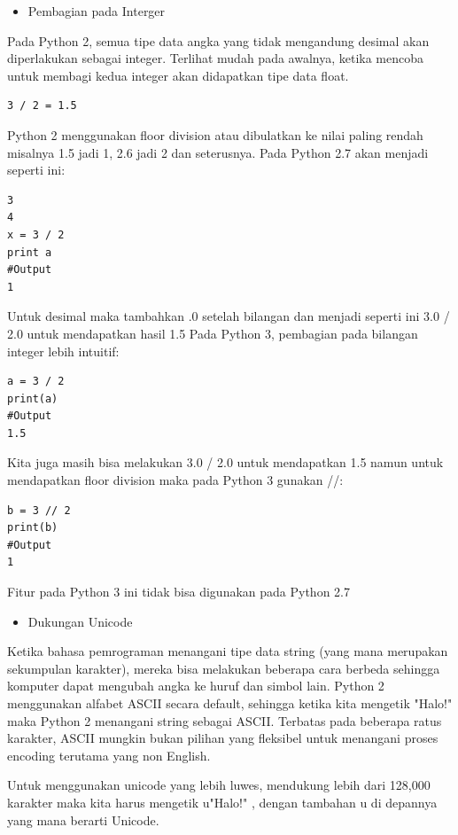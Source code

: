 \begin{itemize}
\item Pembagian pada Interger
\end{itemize}
Pada Python 2, semua tipe data angka yang tidak mengandung desimal akan diperlakukan sebagai integer. Terlihat mudah pada awalnya, ketika mencoba untuk membagi kedua integer akan didapatkan tipe data float.

\begin{lstlisting}
3 / 2 = 1.5
\end{lstlisting}

Python 2 menggunakan floor division atau dibulatkan ke nilai paling rendah misalnya 1.5 jadi 1, 2.6 jadi 2 dan seterusnya. Pada Python 2.7 akan menjadi seperti ini:

\begin{lstlisting}
3
4
x = 3 / 2
print a
#Output
1
\end{lstlisting}

Untuk desimal maka tambahkan .0 setelah bilangan dan menjadi seperti ini 3.0 / 2.0  untuk mendapatkan hasil 1.5
Pada Python 3, pembagian pada bilangan integer lebih intuitif:

\begin{lstlisting}
a = 3 / 2
print(a)
#Output
1.5
\end{lstlisting}

Kita juga masih bisa melakukan 3.0 / 2.0  untuk mendapatkan 1.5 namun untuk mendapatkan floor division maka pada Python 3 gunakan //:
\begin{lstlisting}
b = 3 // 2
print(b)
#Output
1
\end{lstlisting}
Fitur pada Python 3 ini tidak bisa digunakan pada Python 2.7

\begin{itemize}
\item Dukungan Unicode
\end{itemize}

Ketika bahasa pemrograman menangani tipe data string (yang mana merupakan sekumpulan karakter), mereka bisa melakukan beberapa cara berbeda sehingga komputer dapat mengubah angka ke huruf dan simbol lain. Python 2 menggunakan alfabet ASCII secara default, sehingga ketika kita mengetik "Halo!"  maka Python 2 menangani string sebagai ASCII. Terbatas pada beberapa ratus karakter, ASCII mungkin bukan pilihan yang fleksibel untuk menangani proses encoding terutama yang non English.

Untuk menggunakan unicode yang lebih luwes, mendukung lebih dari 128,000 karakter maka kita harus mengetik u"Halo!" , dengan tambahan u  di depannya yang mana berarti Unicode.

